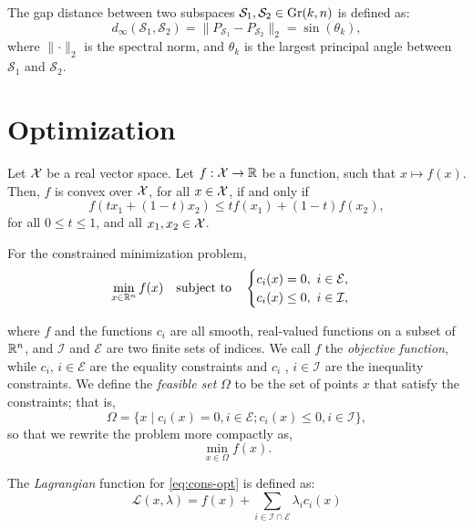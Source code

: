 \begin{definition}
    The gap distance between two subspaces $\mathcal{S}_1, \mathcal{S}_2 \in \text{Gr}(k,n)$ is defined as:
    \[
        d_{\infty}(\mathcal{S}_1, \mathcal{S}_2) = \lVert P_{\mathcal{S}_1} - P_{\mathcal{S}_2} \rVert_{2} = \sin(\theta_k),
    \]
    where $\lVert \cdot \rVert_{2}$ is the spectral norm, and $\theta_k$ is the largest principal angle between $\mathcal{S}_1$ and $\mathcal{S}_2$.
    
\end{definition}

\newpage
\section{Optimization}

\begin{definition}[Convexity]\label{def:conv}
    Let $\mathcal{X}$ be a real vector space. Let $f: \mathcal{X} \to \mathbb{R}$ be a function, such that $x \mapsto f(x)$. Then, $f$ is convex over $\mathcal{X}$, for all $x \in \mathcal{X}$, if and only if
    \[
        f(t x_1 + (1-t)x_2) \leq t f(x_1) + (1-t)f(x_2), 
    \]
    for all $0\leq t \leq 1$, and all $x_1, x_2 \in \mathcal{X}$.
\end{definition}
\begin{definition}
    For the constrained minimization problem,
    \begin{equation}\label{eq:cons-opt}
        \min_{x \in \mathbb{R}^n} f(x) \quad \textrm{subject to} \quad \begin{cases}
            c_i(x) = 0, \ i \in \mathcal{E}, \\
            c_i(x) \leq 0, \ i \in \mathcal{I},
        \end{cases}
    \end{equation}
\end{definition}
where $f$ and the functions $c_i$ are all smooth, real-valued functions on a subset of $\mathbb{R}^n$, and $\mathcal{I}$ and $\mathcal{E}$ are two finite sets of indices. We call $f$ the \emph{objective function}, while $c_i$, $i \in \mathcal{E}$ are the equality constraints and $c_i$ , $i \in \mathcal{I}$ are the inequality constraints. We define the \emph{feasible set} $\Omega$ to be the set of points $x$ that satisfy the constraints; that is,
\[
    \Omega = \{x \mid c_i(x) = 0, i \in \mathcal{E}; c_i(x) \leq 0, i \in \mathcal{I} \},
\]
so that we rewrite the problem more compactly as,
\[
    \min_{x \in \Omega} f(x).
\]
\begin{definition}
    The \emph{Lagrangian} function for \eqref{eq:cons-opt} is defined as:
    \[
        \mathcal{L}(x, \lambda) = f(x) + \sum_{i \in \mathcal{I} \cap \mathcal{E}} \lambda_i c_i(x) 
    \]
\end{definition}
